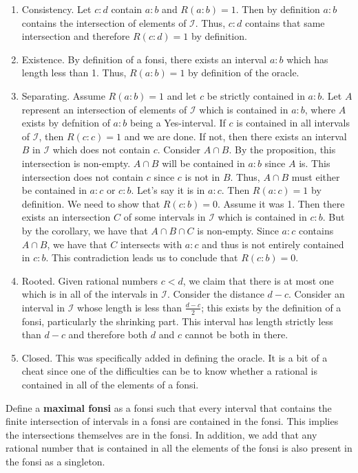 \documentclass[12pt]{article}
\theoremstyle{remark}
\begin{document}
\begin{enumerate}
    \item Consistency. Let $c:d$ contain $a:b$ and $R(a:b)=1$. Then by definition $a:b$ contains the intersection of elements of $\mathcal{I}$. Thus, $c:d$ contains that same  intersection and therefore $R(c:d)=1$ by definition. 
    \item Existence. By definition of a fonsi, there exists an interval $a:b$ which has length less than 1. Thus, $R(a:b)=1$ by definition of the oracle.
    \item Separating. Assume $R(a:b)=1$ and let $c$ be strictly contained in $a:b$. 
    Let $A$ represent an intersection of elements of $\mathcal{I}$ which is contained in 
    $a:b$, where $A$ exists by defnition of $a:b$ being a Yes-interval. If $c$ is contained in all intervals of $\mathcal{I}$, then $R(c:c) =1$ and we are done. If not, then there exists an interval $B$ in $\mathcal{I}$ which does not contain $c$. Consider $A \cap B$. By the proposition, this intersection is non-empty. $A \cap B$ will be contained in $a:b$ since $A$ is.  This intersection does not contain $c$ since $c$ is not in $B$. Thus, $A \cap B$ must either be contained in $a:c$ or $c:b$. Let's say it is in $a:c$. Then $R(a:c) = 1$ by definition. We need to show that $R(c:b) = 0$. Assume it was 1. Then there exists an intersection $C$ of some intervals in $\mathcal{I}$ which is contained in $c:b$. But by the corollary, we have that $A \cap B \cap C$ is non-empty. Since $a:c$ contains $A \cap B$, we have that $C$ intersects with $a:c$ and thus is not entirely contained in $c:b$. This contradiction leads us to conclude that $R(c:b) = 0$.
    \item Rooted. Given rational numbers $c < d$, we claim that there is at most one which is in all of the intervals in $\mathcal{I}$. Consider the distance $d-c$. Consider an  interval in $\mathcal{I}$ whose length is less than $\tfrac{d-c}{2}$; this exists by the definition of a fonsi, particularly the shrinking part. This interval has length strictly less than $d-c$ and therefore both $d$ and $c$ cannot be both in there. 
    \item Closed. This was specifically added in defining the oracle. It is a bit of a cheat since one of the difficulties can be to know whether a rational is contained in all of the elements of a fonsi. 
\end{enumerate}

Define a \textbf{maximal fonsi} as a fonsi such that every interval that contains the finite intersection of intervals in a fonsi are contained in the fonsi. This implies the intersections themselves are in the fonsi. In addition, we add that any rational number that is contained in all the elements of the fonsi is also present in the fonsi as a singleton. 
\end{document}
